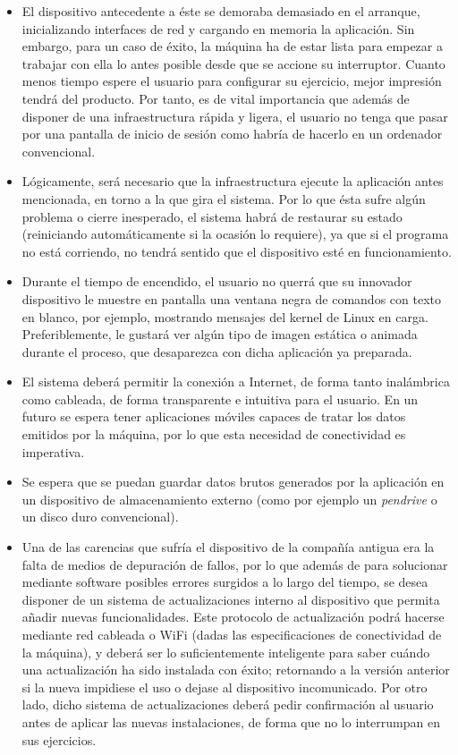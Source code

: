 \begin{itemize}
	\item El dispositivo antecedente a éste se demoraba demasiado en el arranque, inicializando interfaces de red y cargando en memoria la aplicación. Sin embargo, para un caso de éxito, la máquina ha de estar lista para empezar a trabajar con ella lo antes posible desde que se accione su interruptor. Cuanto menos tiempo espere el usuario para configurar su ejercicio, mejor impresión tendrá del producto. Por tanto, es de vital importancia que además de disponer de una infraestructura rápida y ligera, el usuario no tenga que pasar por una pantalla de inicio de sesión como habría de hacerlo en un ordenador convencional.
	\item Lógicamente, será necesario que la infraestructura ejecute la aplicación antes mencionada, en torno a la que gira el sistema. Por lo que ésta sufre algún problema o cierre inesperado, el sistema habrá de restaurar su estado (reiniciando automáticamente si la ocasión lo requiere), ya que si el programa no está corriendo, no tendrá sentido que el dispositivo esté en funcionamiento.
	\item Durante el tiempo de encendido, el usuario no querrá que su innovador dispositivo le muestre en pantalla una ventana negra de comandos con texto en blanco, por ejemplo, mostrando mensajes del kernel de Linux en carga. Preferiblemente, le gustará ver algún tipo de imagen estática o animada durante el proceso, que desaparezca con dicha aplicación ya preparada.
	\item El sistema deberá permitir la conexión a Internet, de forma tanto inalámbrica como cableada, de forma transparente e intuitiva para el usuario. En un futuro se espera tener aplicaciones móviles capaces de tratar los datos emitidos por la máquina, por lo que esta necesidad de conectividad es imperativa.
	\item Se espera que se puedan guardar datos brutos generados por la aplicación en un dispositivo de almacenamiento externo (como por ejemplo un \textit{pendrive} o un disco duro convencional).
	\item Una de las carencias que sufría el dispositivo de la compañía antigua era la falta de medios de depuración de fallos, por lo que además de para solucionar mediante software posibles errores surgidos a lo largo del tiempo, se desea disponer de un sistema de actualizaciones interno al dispositivo que permita añadir nuevas funcionalidades. Este protocolo de actualización podrá hacerse mediante red cableada o WiFi (dadas las especificaciones de conectividad de la máquina), y deberá ser lo suficientemente inteligente para saber cuándo una actualización ha sido instalada con éxito; retornando a la versión anterior si la nueva impidiese el uso o dejase al dispositivo incomunicado. Por otro lado, dicho sistema de actualizaciones deberá pedir confirmación al usuario antes de aplicar las nuevas instalaciones, de forma que no lo interrumpan en sus ejercicios.

\end{itemize}
